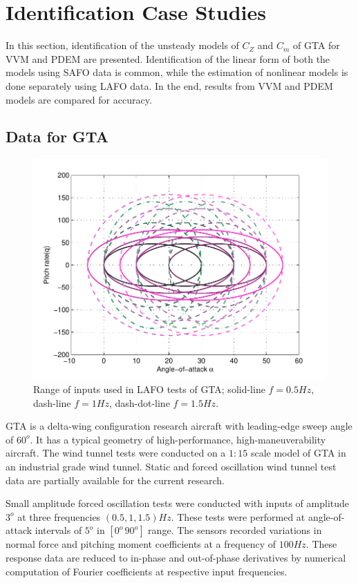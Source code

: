 \documentclass{AIAA}
\begin{document}
\section{Identification Case Studies}
In this section, identification of the unsteady models of $C_Z$ and $C_m$ of GTA for VVM and PDEM are presented. Identification of the linear form of both the models using SAFO data is common, while the estimation of nonlinear models is done separately using LAFO data. In the end, results from VVM and PDEM models are compared for accuracy.

\subsection{Data for GTA}
\begin{figure}[t]
\centering
\includegraphics[scale=0.8]{GTA_inputs}
\caption{Range of inputs used in LAFO tests of GTA; solid-line $f=0.5Hz$, dash-line $f=1Hz$, dash-dot-line $f=1.5Hz$.}
\label{fig:GTA_inputs}
\end{figure}
GTA is a delta-wing configuration research aircraft with leading-edge sweep angle of $60^o$. It has a typical geometry of high-performance, high-maneuverability aircraft. The wind tunnel tests were conducted on a $1:15$ scale model of GTA in an industrial grade wind tunnel. Static and forced oscillation wind tunnel test data are partially available for the current research.

Small amplitude forced oscillation tests were conducted with inputs of amplitude $3^o$ at three frequencies $(0.5,1,1.5) Hz$. These tests were performed at angle-of-attack intervals of $5^o$ in $[0^o \, 90^o]$  range. The sensors recorded variations in normal force and pitching moment coefficients at a frequency of $100 Hz$. These response data are reduced to in-phase and out-of-phase derivatives by numerical computation of Fourier coefficients at respective input frequencies. 
\end{document}
